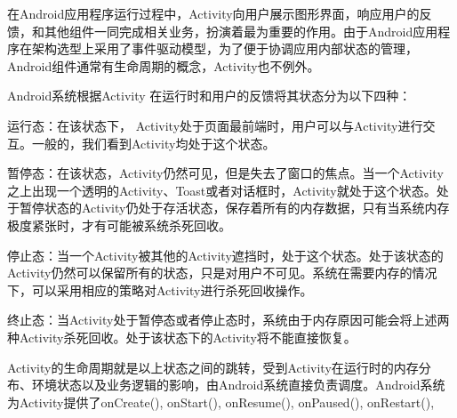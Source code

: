 在Android应用程序运行过程中，Activity向用户展示图形界面，响应用户的反馈，和其他组件一同完成相关业务，扮演着最为重要的作用。由于Android应用程序在架构选型上采用了事件驱动模型，为了便于协调应用内部状态的管理，Android组件通常有生命周期的概念，Activity也不例外。

Android系统根据Activity 在运行时和用户的反馈将其状态分为以下四种：

运行态：在该状态下， Activity处于页面最前端时，用户可以与Activity进行交互。一般的，我们看到Activity均处于这个状态。

暂停态：在该状态，Activity仍然可见，但是失去了窗口的焦点。当一个Activity之上出现一个透明的Activity、Toast或者对话框时，Activity就处于这个状态。处于暂停状态的Activity仍处于存活状态，保存着所有的内存数据，只有当系统内存极度紧张时，才有可能被系统杀死回收。

停止态：当一个Activity被其他的Activity遮挡时，处于这个状态。处于该状态的Activity仍然可以保留所有的状态，只是对用户不可见。系统在需要内存的情况下，可以采用相应的策略对Activity进行杀死回收操作。

终止态：当Activity处于暂停态或者停止态时，系统由于内存原因可能会将上述两种Activity杀死回收。处于该状态下的Activity将不能直接恢复。

Activity的生命周期就是以上状态之间的跳转，受到Activity在运行时的内存分布、环境状态以及业务逻辑的影响，由Android系统直接负责调度。Android系统为Activity提供了onCreate(), onStart(), onResume(), onPaused(), onRestart(), 
 
 
 
